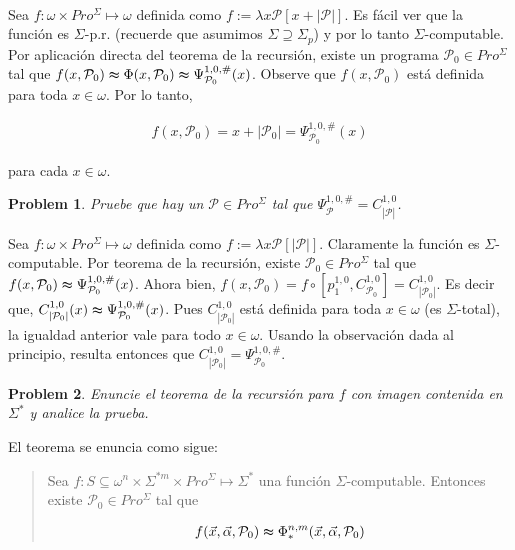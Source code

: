 \documentclass[a4paper, 12pt]{article}
\newtheorem{problem}{Problem}
\newtheorem{problem}{Problem}
\begin{document}
~

Sea $f : \omega\times Pro^{\Sigma} \mapsto \omega $ definida como $f := \lambda
x\mathcal{P} \left[ x + |\mathcal{P}|  \right]$. Es fácil ver que la función es
$\Sigma$-p.r. (recuerde que asumimos $\Sigma \supseteq \Sigma_p$) y por lo tanto
$\Sigma$-computable. Por aplicación directa del teorema de la recursión, existe
un programa $\mathcal{P}_0 \in Pro^{\Sigma}$ tal que $f(x, \mathcal{P}_0) \thickapprox 
\Phi(x, \mathcal{P}_0) \thickapprox  \Psi_{\mathcal{P}_0}^{1, 0, \#}(x)$.
Observe que $f(x, \mathcal{P}_0)$ está definida para toda $x \in  \omega$. Por
lo tanto,

\begin{align*}
    f(x, \mathcal{P}_0) = x + |\mathcal{P}_0| = \Psi_{\mathcal{P}_0}^{1, 0,
    \#}(x)
\end{align*}

para cada $x \in  \omega$.


\begin{problem}
    Pruebe que hay un $\mathcal{P} \in Pro^{\Sigma}$ tal que
    $\Psi_{\mathcal{P}}^{1, 0, \#}= C^{1,
    0}_{|\mathcal{P}|}$.
\end{problem}

Sea $f : \omega \times Pro^{\Sigma} \mapsto \omega $ definida como $f := \lambda
x\mathcal{P}\left[ |\mathcal{P}|  \right]$. Claramente la función es
$\Sigma$-computable. Por teorema de la recursión, existe $\mathcal{P}_0 \in
Pro^{\Sigma}$ tal que $f(x, \mathcal{P}_0)   \thickapprox 
\Psi_{\mathcal{P}_0}^{1, 0, \#}(x)$. Ahora bien, $f(x, \mathcal{P}_0) = f \circ
\left[ p_1^{1, 0}, C_{\mathcal{P}_0}^{1, 0} \right] = C_{|\mathcal{P}_0|}^{1,
0}$. Es decir que,
  $C_{|\mathcal{P}_0|}^{1, 0}(x) \thickapprox
\Psi_{\mathcal{P}_0}^{1, 0, \#}(x)$. Pues $C_{|\mathcal{P}_0|}^{1, 0}$ está
definida para toda $x \in \omega$ (es $\Sigma$-total), la igualdad anterior vale
para todo $x \in \omega$. Usando la observación dada al principio, resulta
entonces que $C_{|\mathcal{P}_0|}^{1, 0} =
\Psi_{\mathcal{P}_0}^{1, 0, \#}$.

\pagebreak

\begin{problem}
    Enuncie el teorema de la recursión para $f$ con imagen contenida en
    $\Sigma^{*}$ y analice la prueba.
\end{problem}

El teorema se enuncia como sigue:


\small
\begin{quote}

    Sea $f : S \subseteq \omega^{n} \times \Sigma^{*m} \times Pro^{\Sigma} \mapsto
    \Sigma^{*}$ una función $\Sigma$-computable. Entonces existe $\mathcal{P}_0 \in
    Pro^{\Sigma}$ tal que 

    \begin{align*}
        f(\vec{x}, \vec{\alpha}, \mathcal{P}_0) \thickapprox  \Phi_{*}^{n, m} (\vec{x},
        \vec{\alpha}, \mathcal{P}_0)
    \end{align*}

\end{quote}
\normalsize
\end{document}
